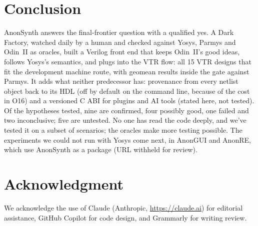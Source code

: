 \documentclass[conference]{IEEEtran}
\begin{document}
\section{Conclusion}
\label{sec:conclusion}

AnonSynth answers the final-frontier question with a qualified yes. A Dark Factory, watched daily by a human and checked against Yosys, Parmys and Odin~II as oracles, built a Verilog front end that keeps Odin~II's good ideas, follows Yosys's semantics, and plugs into the VTR flow: all 15 VTR designs that fit the development machine route, with geomean results inside the gate against Parmys. It adds what neither predecessor has: provenance from every netlist object back to its HDL (off by default on the command line, because of the cost in O16) and a versioned C ABI for plugins and AI tools (stated here, not tested). Of the hypotheses tested, nine are confirmed, four possibly good, one failed and two inconclusive; five are untested. No one has read the code deeply, and we've tested it on a subset of scenarios; the oracles make more testing possible. The experiments we could not run with Yosys come next, in AnonGUI and AnonRE, which use AnonSynth as a package (URL withheld for review).

\section*{Acknowledgment}
We acknowledge the use of Claude (Anthropic, \url{https://claude.ai}) for editorial assistance, GitHub Copilot for code design, and Grammarly for writing review.



\end{document}
